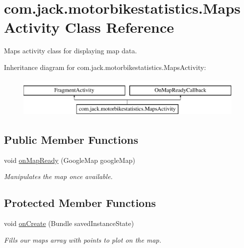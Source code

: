 \hypertarget{classcom_1_1jack_1_1motorbikestatistics_1_1_maps_activity}{}\section{com.\+jack.\+motorbikestatistics.\+Maps\+Activity Class Reference}
\label{classcom_1_1jack_1_1motorbikestatistics_1_1_maps_activity}


Maps activity class for displaying map data.  


Inheritance diagram for com.\+jack.\+motorbikestatistics.\+Maps\+Activity\+:\begin{figure}[H]
\begin{center}
\leavevmode
\includegraphics[height=2.000000cm]{classcom_1_1jack_1_1motorbikestatistics_1_1_maps_activity}
\end{center}
\end{figure}
\subsection*{Public Member Functions}
\begin{DoxyCompactItemize}
\item 
void \hyperlink{classcom_1_1jack_1_1motorbikestatistics_1_1_maps_activity_aefa35b548b2f39bb46b2cb5024be383c}{on\+Map\+Ready} (Google\+Map google\+Map)
\begin{DoxyCompactList}\small\item\em Manipulates the map once available. \end{DoxyCompactList}\end{DoxyCompactItemize}
\subsection*{Protected Member Functions}
\begin{DoxyCompactItemize}
\item 
void \hyperlink{classcom_1_1jack_1_1motorbikestatistics_1_1_maps_activity_afd23eb0cf651de276a9b85bb5fa609b8}{on\+Create} (Bundle saved\+Instance\+State)
\begin{DoxyCompactList}\small\item\em Fills our maps array with points to plot on the map. \end{DoxyCompactList}\end{DoxyCompactItemize}
